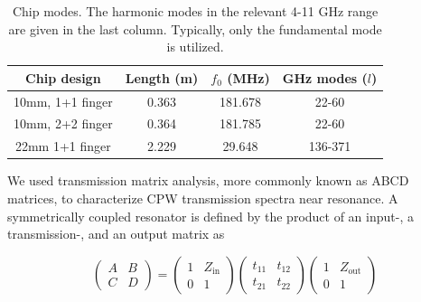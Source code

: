 \documentclass[11 pt, oneside]{book} %
\begin{document}
\begin{table}[htb]
\centering
\begin{tabular}{|c|c|c|c|}
   \hline
   Chip design & Length (m) & $f_0$ (MHz) & GHz modes ($l$) \\
   \hline
   10mm, 1+1 finger & 0.363 & 181.678 & 22-60\\
   \hline
   10mm, 2+2 finger & 0.364 & 181.785 & 22-60\\
   \hline
   22mm 1+1 finger & 2.229 & 29.648 	& 136-371 \\
   \hline
\end{tabular}
\caption[Chip modes]{Chip modes. The harmonic modes in the relevant 4-11 GHz range are given in the last column. Typically, only the fundamental mode is utilized.}
\label{tab:ResonanceSpectrum}
\end{table} 



We used transmission matrix analysis, more commonly known as ABCD matrices, to characterize CPW transmission spectra near resonance. A symmetrically coupled resonator is defined by the product of an input-, a transmission-, and an output matrix as 

\begin{equation}
\left(\begin{array}{cc}
A & B \\
C & D
\end{array}\right) 
=\left(\begin{array}{cc}
1 & Z_{\mathrm{in}} \\
0 & 1
\end{array}\right) 
\left(\begin{array}{cc}
t_{11} & t_{12} \\
t_{21} & t_{22}
\end{array}\right) 
\left(\begin{array}{cc}
1 & Z_{\mathrm{out}} \\
0 & 1
\end{array}\right) 
\end{equation}
\end{document}
